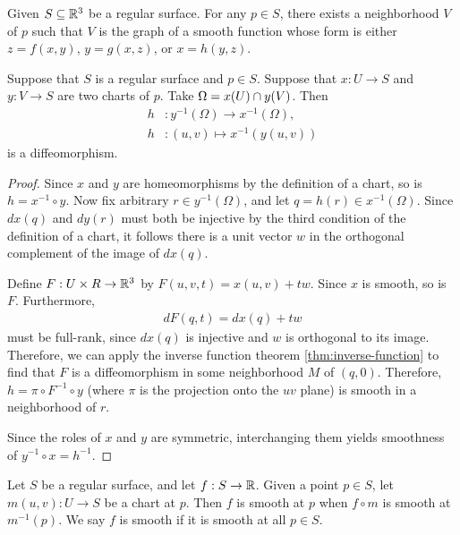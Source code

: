 \begin{thm}
    Given $S \subseteq \mathbb{R}^3$ be a regular surface. For any $p \in S$, there exists a neighborhood $V$ of $p$ such that $V$ is the graph of a smooth function whose form is either $z = f(x, y)$, $y = g(x, z)$, or $x = h(y, z)$.
\end{thm}

\begin{lemma}\label{lemma:change-of-chart}
    Suppose that $S$ is a regular surface and $p \in S$. Suppose that $x: U \to S$ and $y: V \to S$ are two charts of $p$. Take $\Omega = x(U) \cap y(V)$. Then
    \begin{align*}
        h&: y^{-1}(\Omega) \to x^{-1}(\Omega), \\
        h&: (u, v) \mapsto x^{-1}(y(u, v))
    \end{align*}
    is a diffeomorphism.
\end{lemma}

\begin{proof}
    Since $x$ and $y$ are homeomorphisms by the definition of a chart, so is $h = x^{-1} \circ y$. Now fix arbitrary $r \in y^{-1}(\Omega)$, and let $q = h(r) \in x^{-1}(\Omega)$. Since $dx(q)$ and $dy(r)$ must both be injective by the third condition of the definition of a chart, it follows there is a unit vector $w$ in the orthogonal complement of the image of $dx(q)$.

    Define $F: U \times R \to \mathbb{R}^3$ by $F(u, v, t) = x(u, v) + tw$. Since $x$ is smooth, so is $F$. Furthermore,
    \begin{align*}
        dF(q, t) = dx(q) + tw
    \end{align*}
    must be full-rank, since $dx(q)$ is injective and $w$ is orthogonal to its image. Therefore, we can apply the inverse function theorem \ref{thm:inverse-function} to find that $F$ is a diffeomorphism in some neighborhood $M$ of $(q, 0)$. Therefore, $h = \pi \circ F^{-1} \circ y$ (where $\pi$ is the projection onto the $uv$ plane) is smooth in a neighborhood of $r$.

    Since the roles of $x$ and $y$ are symmetric, interchanging them yields smoothness of $y^{-1} \circ x = h^{-1}$.
\end{proof}

\begin{defn}
    Let $S$ be a regular surface, and let $f: S \to \mathbb{R}$. Given a point $p \in S$, let $m(u, v): U \to S$ be a chart at $p$. Then $f$ is smooth at $p$ when $f \circ m$ is smooth at $m^{-1}(p)$. We say $f$ is smooth if it is smooth at all $p \in S$.
\end{defn}

